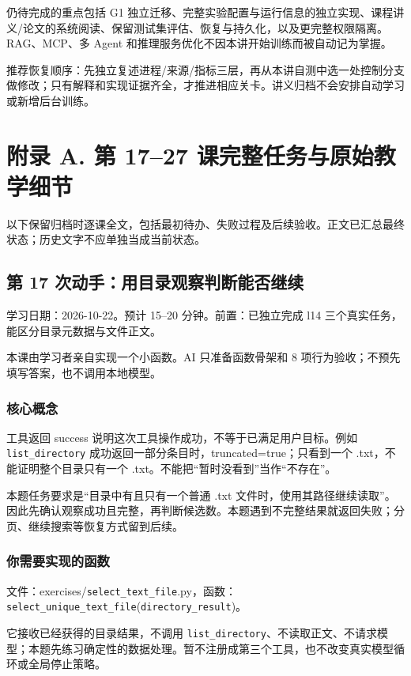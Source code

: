 \documentclass[UTF8,zihao=-4,fontset=fandol]{ctexart}
\begin{document}
仍待完成的重点包括 G1 独立迁移、完整实验配置与运行信息的独立实现、课程讲义/论文的系统阅读、保留测试集评估、恢复与持久化，以及更完整权限隔离。RAG、MCP、多 Agent 和推理服务优化不因本讲开始训练而被自动记为掌握。

推荐恢复顺序：先独立复述进程/来源/指标三层，再从本讲自测中选一处控制分支做修改；只有解释和实现证据齐全，才推进相应关卡。讲义归档不会安排自动学习或新增后台训练。

\section{附录 A. 第 17–27 课完整任务与原始教学细节}
以下保留归档时逐课全文，包括最初待办、失败过程及后续验收。正文已汇总最终状态；历史文字不应单独当成当前状态。

\subsection{第 17 次动手：用目录观察判断能否继续}

学习日期：2026-10-22。预计 15–20 分钟。前置：已独立完成 l14 三个真实任务，能区分目录元数据与文件正文。

本课由学习者亲自实现一个小函数。AI 只准备函数骨架和 8 项行为验收；不预先填写答案，也不调用本地模型。

\subsubsection{核心概念}

工具返回 success 说明这次工具操作成功，不等于已满足用户目标。例如 \nolinkurl{list_directory} 成功返回一部分条目时，truncated=true；只看到一个 .txt，不能证明整个目录只有一个 .txt。不能把“暂时没看到”当作“不存在”。

本题任务要求是“目录中有且只有一个普通 .txt 文件时，使用其路径继续读取”。因此先确认观察成功且完整，再判断候选数。本题遇到不完整结果就返回失败；分页、继续搜索等恢复方式留到后续。

\subsubsection{你需要实现的函数}

文件：exercises/\nolinkurl{select_text_file}.py，函数：\nolinkurl{select_unique_text_file}(\nolinkurl{directory_result})。

它接收已经获得的目录结果，不调用 \nolinkurl{list_directory}、不读取正文、不请求模型；本题先练习确定性的数据处理。暂不注册成第三个工具，也不改变真实模型循环或全局停止策略。
\end{document}
